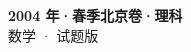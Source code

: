 \documentclass[zihao=-4, a4paper]{ctexart}
\begin{document}
\begin{center}
  {\Large\bfseries 2004 年·春季北京卷·理科}\\[4pt]
  {\large 数学 · 试题版}
\end{center}
\medskip
{}

\end{document}
